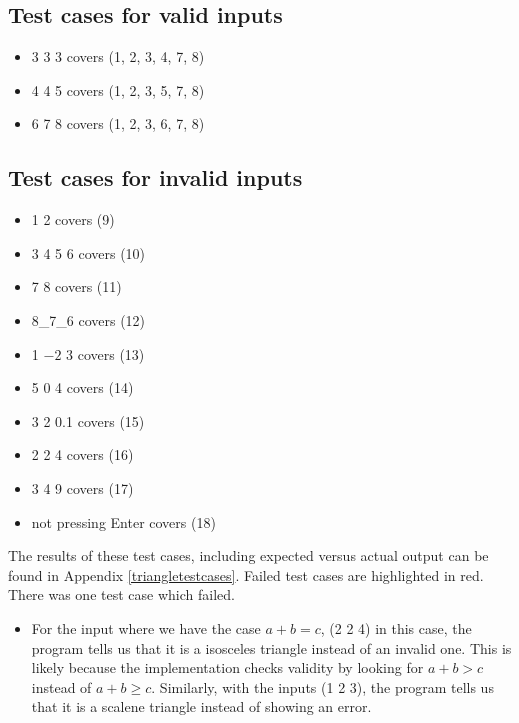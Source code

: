 \documentclass[letterpaper]{article}
\begin{document}
\subsection*{Test cases for valid inputs}
\begin{itemize}
    \item 3 3 3 covers (1, 2, 3, 4, 7, 8)
    \item 4 4 5 covers (1, 2, 3, 5, 7, 8)
    \item 6 7 8 covers (1, 2, 3, 6, 7, 8)
\end{itemize}

\subsection*{Test cases for invalid inputs}
\begin{itemize}
    \item 1 2 covers (9)
    \item 3 4 5 6 covers (10)
    \item 7 8  covers (11)
    \item 8\_7\_6 covers (12)
    \item 1 $-2$ 3 covers (13)
    \item 5 0 4 covers (14)
    \item 3 2 0.1 covers (15)
    \item 2 2 4 covers (16)
    \item 3 4 9 covers (17)
    \item not pressing Enter covers (18)
\end{itemize}

The results of these test cases, including expected versus actual output can be found in Appendix \ref{triangletestcases}.
Failed test cases are highlighted in red. There was one test case which failed. 

\begin{itemize}
    \item For the input where we have the case $a+b=c$,
    (2 2 4) in this case, the program tells us that it is a isosceles triangle instead of an invalid one.
    This is likely because the implementation checks validity by looking for $a+b>c$ instead of $a+b \geq c$.    
    Similarly, with the inputs (1 2 3), the program tells us that it is a scalene triangle instead of showing an error.
\end{itemize}
\end{document}
